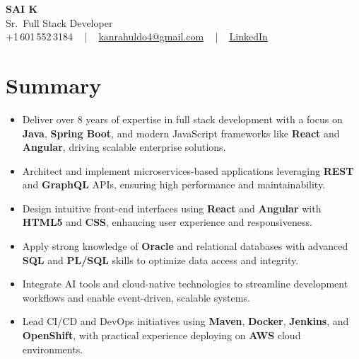 \documentclass[letterpaper,11pt]{article}
\newcommand{\resumeItem}[1]{
  \item\footnotesize{
    {#1 \vspace{-2pt}}
  }
}
\newcommand{\resumeItemListStart}{\begin{itemize}[leftmargin=*]}
\newcommand{\resumeItemListEnd}{\end{itemize}\vspace{-5pt}}
\begin{document}
\begin{center}
    {\fontsize{14pt}{12pt}\selectfont \textbf{\MakeUppercase{Sai K}}}\\ \vspace{2pt}
    \fontsize{10pt}{12pt}\selectfont Sr.\ Full Stack Developer\\ \vspace{2pt}
    \fontsize{10pt}{12pt}\selectfont +1\,601\,552\,3184 ~ | ~
    \href{mailto:kanrahuldo4@gmail.com}{kanrahuldo4@gmail.com} ~ | ~
    \href{https://www.linkedin.com/in/srrrk/}{\color{blue}\underline{LinkedIn}}
    \vspace{-10pt}
\end{center}

\section{Summary}
\fontsize{9pt}{10pt}\selectfont
\resumeItemListStart
  \resumeItem{Deliver over 8 years of expertise in full stack development with a focus on \textbf{Java}, \textbf{Spring Boot}, and modern JavaScript frameworks like \textbf{React} and \textbf{Angular}, driving scalable enterprise solutions.}
  \resumeItem{Architect and implement microservices-based applications leveraging \textbf{REST} and \textbf{GraphQL} APIs, ensuring high performance and maintainability.}
  \resumeItem{Design intuitive front-end interfaces using \textbf{React} and \textbf{Angular} with \textbf{HTML5} and \textbf{CSS}, enhancing user experience and responsiveness.}
  \resumeItem{Apply strong knowledge of \textbf{Oracle} and relational databases with advanced \textbf{SQL} and \textbf{PL/SQL} skills to optimize data access and integrity.}
  \resumeItem{Integrate AI tools and cloud-native technologies to streamline development workflows and enable event-driven, scalable systems.}
  \resumeItem{Lead CI/CD and DevOps initiatives using \textbf{Maven}, \textbf{Docker}, \textbf{Jenkins}, and \textbf{OpenShift}, with practical experience deploying on \textbf{AWS} cloud environments.}
\resumeItemListEnd
\vspace{-6pt}

\end{document}
